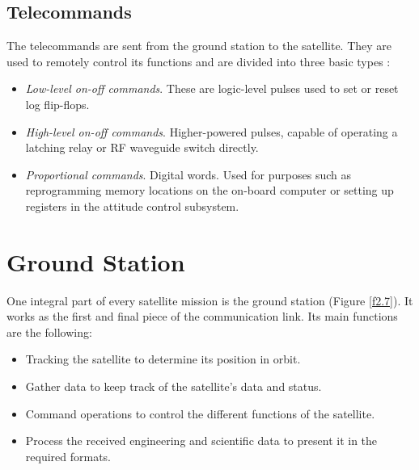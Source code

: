 \pagebreak
\subsection{Telecommands}
The telecommands are sent from the ground station to the satellite. They are used to remotely control its functions and are divided into three basic types \cite{SSEng}:
\begin{itemize}
\item \emph{Low-level on-off commands}. These are logic-level pulses used to set or reset log flip-flops.
\item \emph{High-level on-off commands}. Higher-powered pulses, capable of operating a latching relay or RF waveguide switch directly.
\item \emph{Proportional commands}. Digital words. Used for purposes such as reprogramming memory locations on the on-board computer or setting up registers in the attitude control subsystem.

\end{itemize}


\section{Ground Station}
One integral part of every satellite mission is the ground station (Figure \ref{f2.7}). It works as the first and final piece of the communication link. Its main functions are the following:
\begin{itemize}
\item Tracking the satellite to determine its position in orbit.
\item Gather data to keep track of the satellite's data and status.
\item Command operations to control the different functions of the satellite.
\item Process the received engineering and scientific data to present it in the required formats.
\end{itemize}


